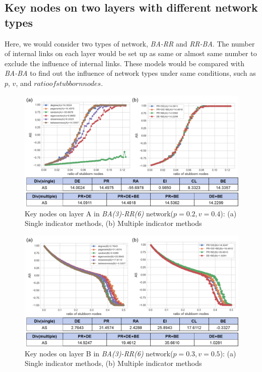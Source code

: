 \subsection{Key nodes on two layers with different network types}
Here, we would consider two types of network, \textit{BA-RR} and \textit{RR-BA}. The number of internal links on each layer would be set up as same or almost same number to exclude the influence of internal links. These models would be compared with \textit{BA-BA} to find out the influence of network types under same conditions, such as $p$, $v$, and $ratio of stubborn nodes$.  
\begin{figure}[!htb]
	\centering
	\includegraphics[width=\hsize]{figure/chap5_keynode_BA_RR_A.png}
	\caption{Key nodes on layer A in \textit{BA(3)-RR(6)} network($p=0.2, v=0.4$):
		(a) Single indicator methods, (b) Multiple indicator methods}
	\label{chap5_keynode_BA_RR_A}
\end{figure}
\begin{figure}[!htb]
	\centering
	\includegraphics[width=\hsize]{figure/chap5_keynode_BA_RR_B.png}
	\caption{Key nodes on layer B in \textit{BA(3)-RR(6)} network($p=0.3, v=0.5$):
		(a) Single indicator methods, (b) Multiple indicator methods}
	\label{chap5_keynode_BA_RR_B}
\end{figure}
